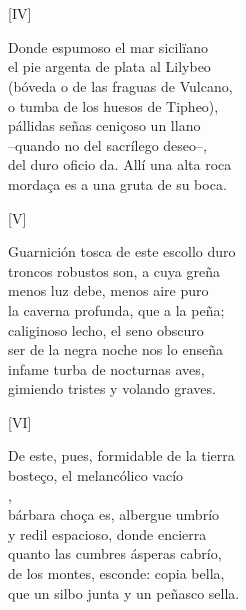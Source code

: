 \documentclass[11pt,a4paper,twoside]{article}
\begin{document}
\section*{\centering\fontsize{11}{14}\selectfont[FÁBVLA]}
\vspace{-1em}
%
\begin{center}
	[IV]
\end{center}
\pstart
Donde espumoso el mar sicilïano\\
el pie argenta de plata al Lilybeo\\
(bóveda o de las fraguas de Vulcano,\\
o tumba de los huesos de Tipheo),\\
pállidas señas ceniçoso un llano\\
--quando no del sacrílego deseo--,\\
del duro oficio da. Allí una alta roca\\
mordaça es a una gruta de su boca.\par\pend
%
\begin{center}
	[V]
\end{center}
\pstart
Guarnición tosca de este escollo duro\\
troncos robustos son, a cuya greña\\
menos luz debe, menos aire puro\\
la caverna profunda, que a la peña;\\
caliginoso lecho, el seno obscuro\\
ser de la negra noche nos lo enseña\\
infame turba de nocturnas aves,\\
gimiendo tristes y volando graves.\par\pend
%
\begin{center}
	[VI]
\end{center}\pstart
De este, pues, formidable de la tierra\\
bosteço, el melancólico vacío\\
,\\
bárbara choça es, albergue umbrío\\
y redil espacioso, donde encierra\\
quanto las cumbres ásperas cabrío,\\
de los montes, esconde: copia bella,\\
que un silbo junta y un peñasco sella.\par\pend
\end{document}

